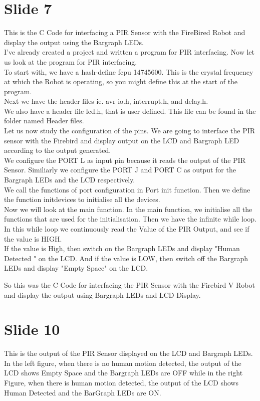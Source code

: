 \documentclass[a4paper,12 pt]{article}
\begin{document}
\section{Slide 7}
This is the C Code for interfacing a PIR Sensor with the FireBired Robot and display the output using the Bargraph LEDs.\\
I've already created a project and written a program for PIR interfacing. Now let us look at the program for PIR interfacing.\\
To start with, we have a hash-define fcpu 14745600. This is the crystal frequency at which the Robot is operating, so you might define this at the start of the program.\\

Next we have the header files ie. avr io.h, interrupt.h, and delay.h. \\
We also have a header file lcd.h, that is user defined. This file can be found in the folder named Header files.\\

Let us now study the configuration of the pins. We are going to interface the PIR sensor with the Firebird and display output on the LCD and Bargraph LED according to the output generated.\\

We configure the PORT L as input pin because it reads the output of the PIR Sensor.
Similiarly we configure the PORT J and PORT C as output for the Bargraph LEDs and the LCD respectively.\\
We call the functions of port configuration in Port init function.
Then we define the function initdevices to initialise all the devices.\\
Now we will look at the main function.
In the main function, we initialise all the functions that are used for the initialisation.
Then we have the infinite while loop. In this while loop we continuously read the Value of the PIR Output, and see if the value is HIGH.\\
If the value is High, then switch on the Bargraph LEDs and display "Human Detected " on the LCD. And if the value is LOW, then switch off the Bargraph LEDs and display "Empty Space" on the LCD. 
			
So this was the C Code for interfacing the PIR Sensor with the Firebird V Robot and display the output using Bargraph LEDs and LCD Display.

\section{Slide 10}
This is the output of the PIR Sensor displayed on the LCD and Bargraph LEDs.
In the left figure, when there is no human motion detected, the output of the LCD shows Empty Space and the Bargraph LEDs are OFF
while in the right Figure, when there is human motion detected, the output of the LCD shows Human Detected and the BarGraph LEDs are ON.\\
\end{document}

